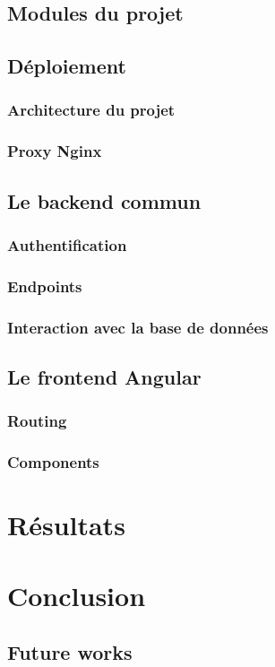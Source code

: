 \documentclass[11pt,a4paper]{report}
\begin{document}
\section{Modules du projet}
\section{Déploiement}
\subsection{Architecture du projet}
\subsection{Proxy Nginx}
\section{Le backend commun}
\subsection{Authentification}
\subsection{Endpoints}
\subsection{Interaction avec la base de données}
\section{Le frontend Angular}
\subsection{Routing}
\subsection{Components}
\chapter{Résultats}
\chapter{Conclusion}
\section{Future works}


\end{document}
